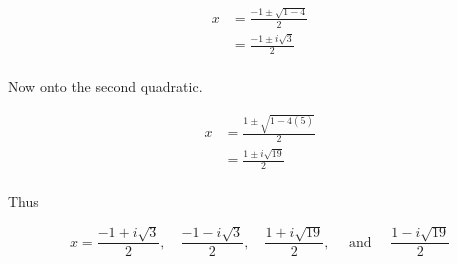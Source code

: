 \begin{align*}
x &= \frac{-1 \pm \sqrt{1 - 4}}{2} \\
&= \frac{-1 \pm i \sqrt{3}}{2} \\
\end{align*}

Now onto the second quadratic.

\begin{align*}
x &= \frac{1 \pm \sqrt{1 - 4(5)}}{2} \\
&= \frac{1 \pm i \sqrt{19}}{2} \\
\end{align*}

Thus

$$ \boxed{x = \frac{-1 + i \sqrt{3}}{2},  \quad \frac{-1 - i \sqrt{3}}{2}, \quad \frac{1 + i \sqrt{19}}{2}, \quad \text{ and } \quad \frac{1 - i \sqrt{19}}{2}} $$
